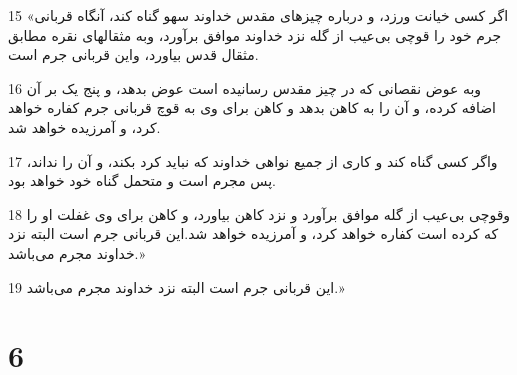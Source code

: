 \par 15 «اگر کسی خیانت ورزد، و درباره چیزهای مقدس خداوند سهو گناه کند، آنگاه قربانی جرم خود را قوچی بی‌عیب از گله نزد خداوند موافق برآورد، وبه مثقالهای نقره مطابق مثقال قدس بیاورد، واین قربانی جرم است.
\par 16 وبه عوض نقصانی که در چیز مقدس رسانیده است عوض بدهد، و پنج یک بر آن اضافه کرده، و آن را به کاهن بدهد و کاهن برای وی به قوچ قربانی جرم کفاره خواهد کرد، و آمرزیده خواهد شد.
\par 17 واگر کسی گناه کند و کاری از جمیع نواهی خداوند که نباید کرد بکند، و آن را نداند، پس مجرم است و متحمل گناه خود خواهد بود.
\par 18 وقوچی بی‌عیب از گله موافق برآورد و نزد کاهن بیاورد، و کاهن برای وی غفلت او را که کرده است کفاره خواهد کرد، و آمرزیده خواهد شد.این قربانی جرم است البته نزد خداوند مجرم می‌باشد.»
\par 19 این قربانی جرم است البته نزد خداوند مجرم می‌باشد.»
 
\chapter{6}

